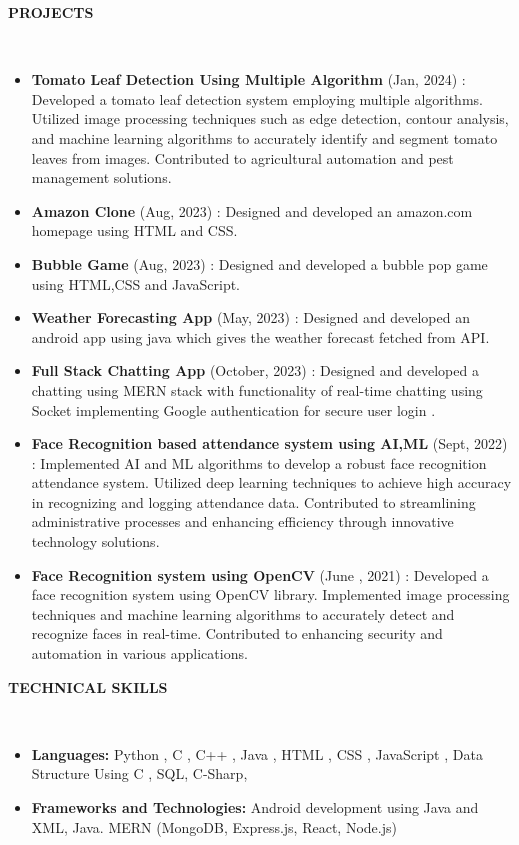 \documentclass[a4paper,10pt]{article}
\newcommand{\lsep}{-0.5cm}
\newcommand{\resheading}[1]{{\small \colorbox{mygrey}{\begin{minipage}{0.975\textwidth}{\textbf{#1 \vphantom{p\^{E}}}}\end{minipage}}}}
\begin{document}
\resheading{\textbf{PROJECTS} }\\[\lsep]
\begin{itemize}
\setlength\itemsep{0.5em}

\item \textbf{Tomato Leaf Detection Using Multiple Algorithm} (Jan, 2024) : Developed a tomato leaf detection system employing multiple algorithms. Utilized image processing techniques such as edge detection, contour analysis, and machine learning algorithms to accurately identify and segment tomato leaves from images. Contributed to agricultural automation and pest management solutions.
\item \textbf{Amazon Clone} (Aug, 2023) : Designed and developed an amazon.com homepage using HTML and CSS. 
\item \textbf{Bubble Game} (Aug, 2023) : Designed and developed a bubble pop game using HTML,CSS and JavaScript. 
\item \textbf{Weather Forecasting App} (May, 2023) : Designed and developed an android app using java which gives the weather forecast fetched from API. 

\item \textbf{Full Stack Chatting App} (October, 2023) : Designed and developed a chatting  using MERN stack with functionality of real-time chatting using Socket implementing Google authentication for secure user login . 
 

\item \textbf{Face Recognition based attendance system using AI,ML} (Sept, 2022) : Implemented AI and ML algorithms to develop a robust face recognition attendance system. Utilized deep learning techniques to achieve high accuracy in recognizing and logging attendance data. Contributed to streamlining administrative processes and enhancing efficiency through innovative technology solutions.


\item \textbf{Face Recognition system using OpenCV } (June , 2021) : Developed a face recognition system using OpenCV library. Implemented image processing techniques and machine learning algorithms to accurately detect and recognize faces in real-time. Contributed to enhancing security and automation in various applications.
\end{itemize}

\resheading{\textbf{TECHNICAL SKILLS} }\\[\lsep]
\begin{itemize}
\setlength\itemsep{0.em}
\item \noindent \textbf{Languages:} Python , C , C++ , Java , HTML , CSS , JavaScript  , Data Structure Using C , SQL, C-Sharp,
\item \noindent \textbf{Frameworks and Technologies:}
Android development using Java and XML,
Java.
 MERN (MongoDB, Express.js, React, Node.js)
\end{itemize}
\end{document}
